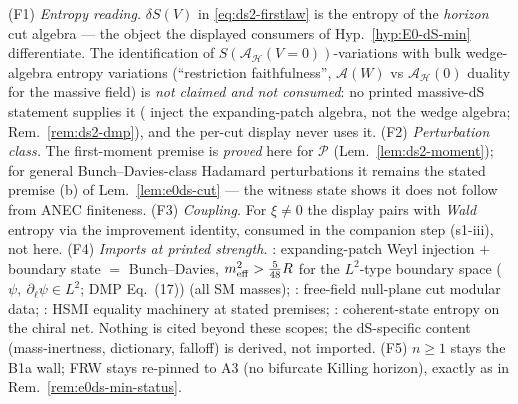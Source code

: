 \begin{remark}
\label{rem:ds2-fences}
(F1) \emph{Entropy reading.} $\delta S(V)$ in
\eqref{eq:ds2-firstlaw} is the entropy of the \emph{horizon} cut
algebra --- the object the displayed consumers of
Hyp.~\ref{hyp:E0-dS-min} differentiate. The identification of
$S(\mathcal A_{\mathcal H}(V{=}0))$-variations with bulk wedge-algebra
entropy variations (``restriction faithfulness'',
$\mathcal A(W)$ vs $\mathcal A_{\mathcal H}(0)$ duality for the
massive field) is \emph{not claimed and not consumed}: no printed
massive-dS statement supplies it
(\cite{DappiaggiMorettiPinamonti2009} inject the expanding-patch
algebra, not the wedge algebra; Rem.~\ref{rem:ds2-dmp}), and the
per-cut display never uses it. (F2) \emph{Perturbation class.} The
first-moment premise is \emph{proved} here for $\mathcal P$
(Lem.~\ref{lem:ds2-moment}); for general Bunch--Davies-class Hadamard
perturbations it remains the stated premise (b) of
Lem.~\ref{lem:e0ds-cut} --- the witness state shows it does not
follow from ANEC finiteness. (F3) \emph{Coupling.} For $\xi\neq0$
the display pairs with \emph{Wald} entropy via the improvement
identity, consumed in the companion step (s1-iii),
not here. (F4) \emph{Imports at printed strength.}
\cite{DappiaggiMorettiPinamonti2009}: expanding-patch Weyl
injection $+$ boundary state $=$ Bunch--Davies, $m^2_{\rm
eff}>\tfrac5{48}R$ for the $L^2$-type boundary space ($\psi,\ \partial_\ell\psi\in L^2$; DMP Eq.\ (17)) (all SM
masses); \cite{CasiniTesteTorroba2017,Wall2012}: free-field
null-plane cut modular data; \cite{CeyhanFaulkner2018}: HSMI
equality machinery at stated premises; \cite{Longo2019coherent}:
coherent-state entropy on the chiral net. Nothing is cited beyond
these scopes; the dS-specific content (mass-inertness, dictionary,
falloff) is derived, not imported. (F5) $n\ge1$ stays the B1a wall;
FRW stays re-pinned to A3 (no bifurcate Killing horizon), exactly as
in Rem.~\ref{rem:e0ds-min-status}.
\end{remark}
